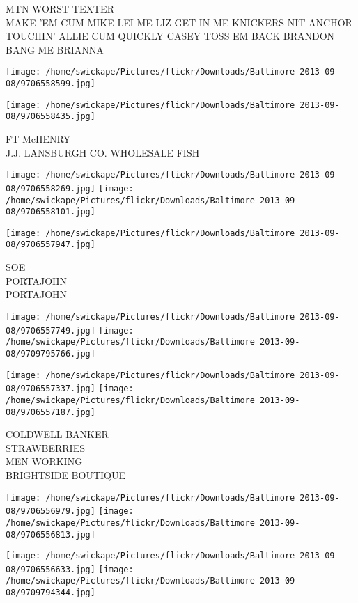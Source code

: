 \documentclass[10pt,letterpaper]{article}
\begin{document}
MTN WORST TEXTER\\
MAKE 'EM CUM MIKE LEI ME LIZ GET IN ME KNICKERS NIT ANCHOR TOUCHIN' ALLIE CUM QUICKLY CASEY TOSS EM BACK BRANDON BANG ME BRIANNA
\pagebreak

\texttt{[image: /home/swickape/Pictures/flickr/Downloads/Baltimore 2013-09-08/9706558599.jpg]}

\vspace{0.25in}
\texttt{[image: /home/swickape/Pictures/flickr/Downloads/Baltimore 2013-09-08/9706558435.jpg]}

FT McHENRY\\
J.J. LANSBURGH CO. WHOLESALE FISH
\pagebreak

\texttt{[image: /home/swickape/Pictures/flickr/Downloads/Baltimore 2013-09-08/9706558269.jpg]}
\texttt{[image: /home/swickape/Pictures/flickr/Downloads/Baltimore 2013-09-08/9706558101.jpg]}

\vspace{0.25in}
\texttt{[image: /home/swickape/Pictures/flickr/Downloads/Baltimore 2013-09-08/9706557947.jpg]}

SOE\\
PORTAJOHN\\
PORTAJOHN
\pagebreak

\texttt{[image: /home/swickape/Pictures/flickr/Downloads/Baltimore 2013-09-08/9706557749.jpg]}
\texttt{[image: /home/swickape/Pictures/flickr/Downloads/Baltimore 2013-09-08/9709795766.jpg]}

\texttt{[image: /home/swickape/Pictures/flickr/Downloads/Baltimore 2013-09-08/9706557337.jpg]}
\texttt{[image: /home/swickape/Pictures/flickr/Downloads/Baltimore 2013-09-08/9706557187.jpg]}

COLDWELL BANKER\\
STRAWBERRIES\\
MEN WORKING\\
BRIGHTSIDE BOUTIQUE
\pagebreak

\texttt{[image: /home/swickape/Pictures/flickr/Downloads/Baltimore 2013-09-08/9706556979.jpg]}
\texttt{[image: /home/swickape/Pictures/flickr/Downloads/Baltimore 2013-09-08/9706556813.jpg]}

\texttt{[image: /home/swickape/Pictures/flickr/Downloads/Baltimore 2013-09-08/9706556633.jpg]}
\texttt{[image: /home/swickape/Pictures/flickr/Downloads/Baltimore 2013-09-08/9709794344.jpg]}
\end{document}
